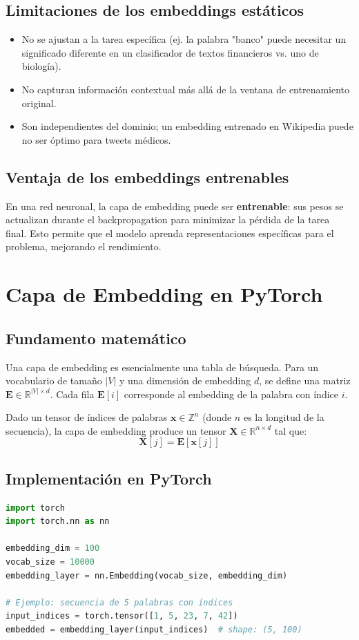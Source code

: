 \documentclass[12pt,a4paper,openany,oneside]{book}
\begin{document}
\subsection{Limitaciones de los embeddings estáticos}
\begin{itemize}
    \item No se ajustan a la tarea específica (ej. la palabra "banco" puede necesitar un significado diferente en un clasificador de textos financieros vs. uno de biología).
    \item No capturan información contextual más allá de la ventana de entrenamiento original.
    \item Son independientes del dominio; un embedding entrenado en Wikipedia puede no ser óptimo para tweets médicos.
\end{itemize}

\subsection{Ventaja de los embeddings entrenables}
En una red neuronal, la capa de embedding puede ser \textbf{entrenable}: sus pesos se actualizan durante el backpropagation para minimizar la pérdida de la tarea final. Esto permite que el modelo aprenda representaciones específicas para el problema, mejorando el rendimiento.

\section{Capa de Embedding en PyTorch}

\subsection{Fundamento matemático}
Una capa de embedding es esencialmente una tabla de búsqueda. Para un vocabulario de tamaño \(|V|\) y una dimensión de embedding \(d\), se define una matriz \(\mathbf{E} \in \mathbb{R}^{|V| \times d}\). Cada fila \(\mathbf{E}[i]\) corresponde al embedding de la palabra con índice \(i\).

Dado un tensor de índices de palabras \(\mathbf{x} \in \mathbb{Z}^{n}\) (donde \(n\) es la longitud de la secuencia), la capa de embedding produce un tensor \(\mathbf{X} \in \mathbb{R}^{n \times d}\) tal que:
\[
\mathbf{X}[j] = \mathbf{E}[ \mathbf{x}[j] ]
\]

\subsection{Implementación en PyTorch}
\begin{lstlisting}[language=Python]
import torch
import torch.nn as nn

embedding_dim = 100
vocab_size = 10000
embedding_layer = nn.Embedding(vocab_size, embedding_dim)

# Ejemplo: secuencia de 5 palabras con índices
input_indices = torch.tensor([1, 5, 23, 7, 42])
embedded = embedding_layer(input_indices)  # shape: (5, 100)
\end{lstlisting}
\end{document}
